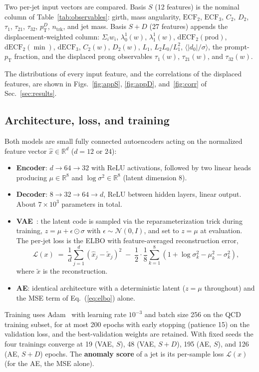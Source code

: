\documentclass[a4paper,11pt]{article}
\newcommand{\dnought}{d_0}
\newcommand{\pT}{p_{\mathrm{T}}}
\begin{document}
Two per-jet input vectors are compared. Basis $S$ (12 features) is the
nominal column of Table~\ref{tab:observables}: girth, mass angularity,
$\mathrm{ECF}_2$, $\mathrm{ECF}_3$, $C_2$, $D_2$, $\tau_1$,
$\tau_{21}$, $\tau_{32}$, $\pT^D$, $n_{\mathrm{trk}}$, and jet mass.
Basis $S{+}D$ (27 features) appends the displacement-weighted column:
$\Sigma_i w_i$, $\lambda^1_0(w)$, $\lambda^1_1(w)$,
$\mathrm{dECF}_2(\mathrm{prod})$, $\mathrm{dECF}_2(\min)$,
$\mathrm{dECF}_3$, $C_2(w)$, $D_2(w)$, $L_1$, $L_2L_0/L_1^2$,
$\langle|\dnought|/\sigma\rangle$, the prompt-$\pT$ fraction, and the
displaced prong observables $\tau_1(w)$, $\tau_{21}(w)$, and
$\tau_{32}(w)$.

The distributions of every input feature, and the correlations of the
displaced features, are shown in Figs.~\ref{fig:appS}, \ref{fig:appD},
and~\ref{fig:corr} of Sec.~\ref{sec:results}.

\subsection{Architecture, loss, and training}
\label{sec:adtrain}

Both models are small fully connected autoencoders acting on the
normalized feature vector $\hat x \in \mathbb{R}^{d}$ ($d = 12$ or
$24$):
\begin{itemize}
  \item \textbf{Encoder}: $d \to 64 \to 32$ with ReLU activations,
  followed by two linear heads producing $\mu \in \mathbb{R}^{8}$ and
  $\log\sigma^2 \in \mathbb{R}^{8}$ (latent dimension 8).
  \item \textbf{Decoder}: $8 \to 32 \to 64 \to d$, ReLU between hidden
  layers, linear output. About $7\times 10^3$ parameters in total.
  \item \textbf{VAE}~\cite{Kingma:2013hel}: the latent code is sampled
  via the reparameterization trick during training, $z = \mu + \epsilon \odot
  \sigma$ with $\epsilon \sim \mathcal{N}(0, I)$, and set to
  $z = \mu$ at evaluation. The per-jet loss is the ELBO with
  feature-averaged reconstruction error,
  \begin{equation}
    \mathcal{L}(x) \;=\; \frac{1}{d}\sum_{j=1}^{d}
        (\hat x_j - \tilde x_j)^2
    \;-\; \frac{1}{2}\cdot\frac{1}{8}\sum_{k=1}^{8}
        \left(1 + \log\sigma_k^2 - \mu_k^2 - \sigma_k^2\right),
    \label{eq:elbo}
  \end{equation}
  where $\tilde x$ is the reconstruction.
  \item \textbf{AE}: identical architecture with a deterministic
  latent ($z = \mu$ throughout) and the MSE term of
  Eq.~(\ref{eq:elbo}) alone.
\end{itemize}
Training uses Adam~\cite{Kingma:2014vow} with learning rate $10^{-3}$ and batch size 256 on
the QCD training subset, for at most 200 epochs with early stopping
(patience 15) on the validation loss, and the best-validation weights are
retained. With fixed seeds the four trainings converge at 19 (VAE,
$S$), 48 (VAE, $S{+}D$), 195 (AE, $S$), and 126 (AE, $S{+}D$) epochs.
The \textbf{anomaly score} of a jet is its per-sample loss
$\mathcal{L}(x)$ (for the AE, the MSE alone).
\end{document}
